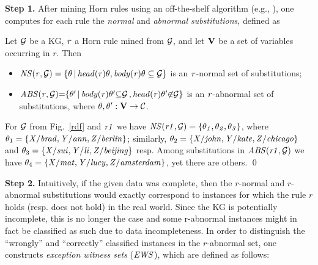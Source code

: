 \noindent \textbf{Step 1.} After mining Horn rules using an off-the-shelf algorithm (e.g.,
 \cite{amie}), %
 one computes for each rule the \emph{normal} and
\emph{abnormal substitutions}, defined as

\begin{definition}\label{sec:rulelearn}
Let $\mathcal{G}$ be a KG, $\mathit{r}$ a Horn rule mined from $\mathcal{G}$, and let ${\mathbf V}$ be a set of variables occurring in $r$. Then
\begin{itemize}
\item $\mathit{NS(r, \mathcal{G})=\{\theta\, |\, head(r)\theta,body(r)\theta \subseteq \mathcal{G}\}}$ is an $\mathit{r}$-normal set of substitutions;
\item $\mathit{ABS(r, \mathcal{G}){=}\{\theta'\, |\, body(r)\theta' {\subseteq} \mathcal{G}\,{,}\,head(r)\theta' {\not \in} \mathcal{G}\}}$ is an $\mathit{r}$-abnormal set of substitutions, 
where $\theta,\theta':{\mathbf V} \rightarrow \mathcal{C}$.
\end{itemize} 
\end{definition}

\begin{example}\label{ex:abns}
For $\mathcal{G}$ from Fig.~\ref{rdf} and $\mathit{r1}$ 
we have $\mathit{NS(r1,\mathcal{G})}=\{\mathit{\theta_1,\theta_2,\theta_3}\}$, where $\theta_1=\{\mathit{X/brad,Y/ann,Z/berlin}\}$; similarly, $\theta_2=\{\mathit{X/john,Y/kate,Z/chicago}\}$ and $\theta_3=\{\mathit{X/sui,Y/li,Z/beijing}\}$ resp. Among substitutions in $\mathit{ABS(r1,\mathcal{G})}$ we have $\theta_4=\{\mathit{X/mat,Y/lucy,Z/amsterdam}\}$, yet there are others. \qed 
\end{example}
 


\noindent \textbf{Step 2.} Intuitively, if the given data was complete, then the $r$-normal
and $r$-abnormal substitutions would exactly correspond to instances for which
the rule $r$ holds (resp. does not hold) in the real world. Since the KG is
potentially incomplete, this is no longer the case and some r-abnormal instances
might in fact be classified as such due to data incompleteness.  In order to
distinguish the ``wrongly'' and ``correctly'' classified instances in the
$r$-abnormal set, one constructs \emph{exception witness sets} ($\mathit{EWS}$), which
are defined as follows:

